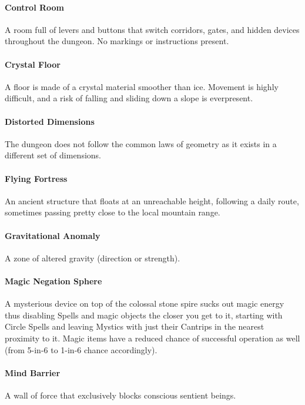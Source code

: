 \documentclass[itdr/core]{subfiles}
\begin{document}
\paragraph{Control Room}
A room full of levers and buttons that switch corridors, gates, and hidden devices throughout the dungeon. No markings or instructions present.

\vfill
\paragraph{Crystal Floor}
A floor is made of a crystal material smoother than ice. Movement is highly difficult, and a risk of falling and sliding down a slope is everpresent.

\vfill
\paragraph{Distorted Dimensions}
The dungeon does not follow the common laws of geometry as it exists in a different set of dimensions.

\vfill
\paragraph{Flying Fortress}
An ancient structure that floats at an unreachable height, following a daily route, sometimes passing pretty close to the local mountain range.

\vfill
\paragraph{Gravitational Anomaly}
A zone of altered gravity (direction or strength).

\vfill
\paragraph{Magic Negation Sphere}
A mysterious device on top of the colossal stone spire sucks out magic energy thus disabling Spells and magic objects the closer you get to it, starting with  Circle Spells and leaving Mystics with just their Cantrips in the nearest proximity to it. Magic items have a reduced chance of successful operation as well (from 5-in-6 to 1-in-6 chance accordingly).

\vfill
\paragraph{Mind Barrier}
A wall of force that exclusively blocks conscious sentient beings.
\end{document}
